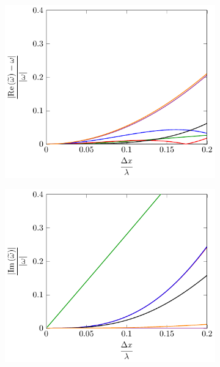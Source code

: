 \begin{figure}
	\centering
	\begin{subfigure}{0.5\textwidth}
		\includegraphics[width=\textwidth]{./chp4/figures/Dispu1khFillRez.pdf}
	\end{subfigure}%
	\begin{subfigure}{0.5\textwidth}
		\includegraphics[width=\textwidth]{./chp4/figures/Dispu1khFillImz.pdf}
	\end{subfigure}
	\par\bigskip

\end{figure}
